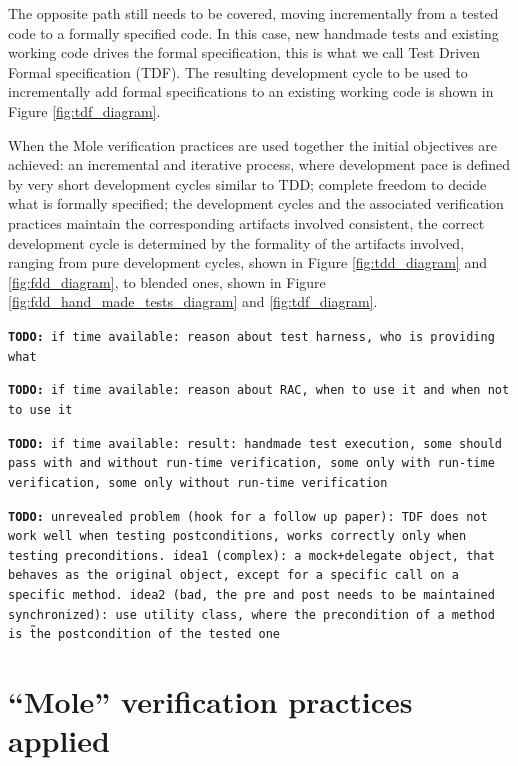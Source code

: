 \documentclass[english]{lni}
\newcommand{\todo}[1]{\texttt{\textbf{TODO:} #1}}
\begin{document}
The opposite path still needs to be covered, moving incrementally from a tested code to a formally specified code.
In this case, new handmade tests and existing working code drives the formal specification, this is what we call Test Driven Formal specification (TDF).
The resulting development cycle to be used to incrementally add formal specifications to an existing working code is shown in Figure \ref{fig:tdf_diagram}.

When the Mole verification practices are used together the initial objectives are achieved: an incremental and iterative process, where development pace is defined by very short development cycles similar to TDD; complete freedom to decide what is formally specified; the development cycles and the associated verification practices maintain the corresponding artifacts involved consistent, the correct development cycle is determined by the formality of the artifacts involved, ranging from pure development cycles, shown in Figure \ref{fig:tdd_diagram} and \ref{fig:fdd_diagram}, to blended ones, shown in Figure \ref{fig:fdd_hand_made_tests_diagram} and \ref{fig:tdf_diagram}.

\todo{if time available: reason about test harness, who is providing what}

\todo{if time available: reason about RAC, when to use it and when not to use it}

\todo{if time available: result: handmade test execution, some should pass with and without run-time verification, some only with run-time verification, some only without run-time verification}

\todo{unrevealed problem (hook for a follow up paper): TDF does not work well when testing postconditions, works correctly only when testing preconditions. idea1 (complex): a mock+delegate object, that behaves as the original object, except for a specific call on a specific method. idea2 (bad, the pre and post needs to be maintained synchronized): use utility class, where the precondition of a method is \~ the postcondition of the tested one}



\section{``Mole'' verification practices applied}
\label{sec:a_complex_case_study}
\end{document}
